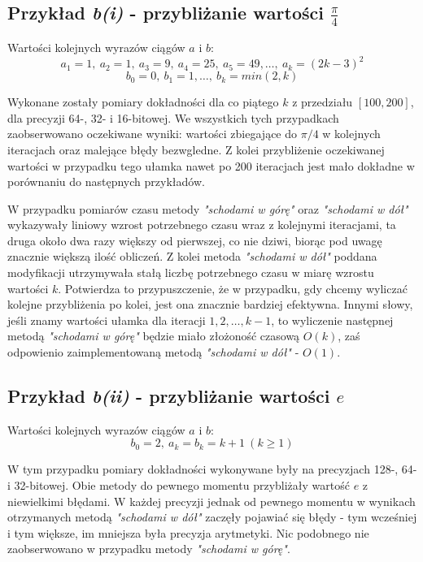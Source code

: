 \documentclass{article}
\begin{document}
\subsection{Przykład \textit{b(i)} - przybliżanie wartości $\displaystyle\frac{\pi}{4}$}

Wartości kolejnych wyrazów ciągów $a$ i $b$:
$$a_1=1,\ a_2=1,\ a_3=9,\ a_4=25,\ a_5=49,\ldots,\ a_k=(2k-3)^2$$
$$b_0=0,\ b_1=1,\ldots,\ b_k=min(2, k)$$

Wykonane zostały pomiary dokładności dla co piątego $k$ z przedziału $[100, 200]$, dla precyzji 64-, 32- i 16-bitowej. We wszystkich tych przypadkach zaobserwowano oczekiwane wyniki: wartości zbiegające do $\pi/4$ w kolejnych iteracjach oraz malejące błędy bezwgledne. Z kolei przybliżenie oczekiwanej wartości w przypadku tego ułamka nawet po 200 iteracjach jest mało dokładne w porównaniu do następnych przykładów.

W przypadku pomiarów czasu metody \textit{"schodami w górę"} oraz \textit{"schodami w dół"} wykazywały liniowy wzrost potrzebnego czasu wraz z kolejnymi iteracjami, ta druga około dwa razy większy od pierwszej, co nie dziwi, biorąc pod uwagę znacznie większą ilość obliczeń. Z kolei metoda \textit{"schodami w dół"} poddana modyfikacji utrzymywała stałą liczbę potrzebnego czasu w miarę wzrostu wartości $k$. Potwierdza to przypuszczenie, że w przypadku, gdy chcemy wyliczać kolejne przybliżenia po kolei, jest ona znacznie bardziej efektywna. Innymi słowy, jeśli znamy wartości ułamka dla iteracji $1,2,\ldots,k-1$, to wyliczenie następnej metodą \textit{"schodami w górę"} będzie miało złożoność czasową $O(k)$, zaś odpowienio zaimplementowaną metodą \textit{"schodami w dół"} - $O(1)$.

\subsection{Przykład \textit{b(ii)} - przybliżanie wartości $e$}

Wartości kolejnych wyrazów ciągów $a$ i $b$:
$$b_0=2,\ a_k=b_k=k+1\ (k\geq1)$$

W tym przypadku pomiary dokładności wykonywane były na precyzjach 128-, 64- i 32-bitowej. Obie metody do pewnego momentu przybliżały wartość $e$ z niewielkimi błędami. W każdej precyzji jednak od pewnego momentu w wynikach otrzymanych metodą \textit{"schodami w dół"} zaczęły pojawiać się błędy - tym wcześniej i tym większe, im mniejsza była precyzja arytmetyki. Nic podobnego nie zaobserwowano w przypadku metody \textit{"schodami w górę"}.
\end{document}

